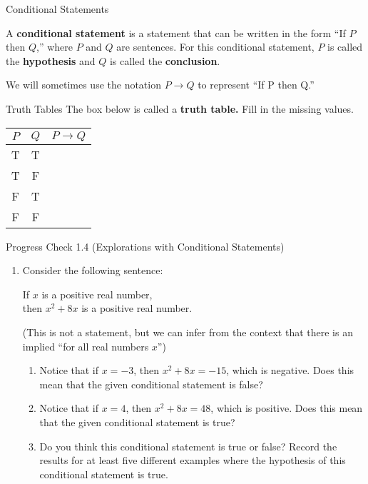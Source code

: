 \documentclass{beamer}
\begin{document}
\begin{frame}{Conditional Statements}
	\begin{definition}
		A \textbf{conditional statement} is a statement that can be written in
		the form ``If $P$ then $Q$,'' where $P$ and $Q$ are sentences. For this conditional
		statement, $P$ is called the \textbf{hypothesis} and $Q$ is called the \textbf{conclusion}.
	\end{definition}

	We will sometimes use the notation $P \to Q$ to represent ``If P then Q.''
\end{frame}

\begin{frame}{Truth Tables}
	The box below is called a \textbf{truth table.}  Fill in the missing values.
	
	\begin{center}
		\begin{tabular}{|c|c|c|}
			\hline
			$P$ & $Q$ & $P \to Q$\\ \hline
			T & T & \\ \hline
			T & F & \\ \hline
			F & T & \\ \hline
			F & F & \\ \hline
		\end{tabular}
	\end{center}	
\end{frame}

\begin{frame}{Progress Check 1.4 (Explorations with Conditional Statements)}
	\begin{enumerate}
		\item Consider the following sentence:
		\begin{center}
			If $x$ is a positive real number,\\ then $x^2 + 8x$ is a positive real number.
		\end{center}
	(This is not a statement, but we can infer from the context that there is an implied ``for all real numbers $x$'')
	\begin{enumerate}
		\item Notice that if $x = -3$, then $x^2 + 8x = -15$, which is negative. Does
		this mean that the given conditional statement is false? \pause
		\item Notice that if $x = 4$, then $x^2 + 8x = 48$, which is positive. Does this
		mean that the given conditional statement is true? \pause
		\item Do you think this conditional statement is true or false? Record the
		results for at least five different examples where the hypothesis of this
		conditional statement is true.
	\end{enumerate}
	\end{enumerate}
\end{frame}
\end{document}
